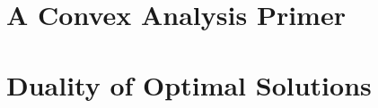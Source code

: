 \documentclass[11pt, a4paper, BCOR=7mm, DIV=11]{scrbook}
\theoremstyle{definition}
\theoremstyle{plain}
\begin{document}
\section{A Convex Analysis Primer}
  
\section{Duality of Optimal Solutions}
  

\renewcommand{\bibsection}
{
\chapter*{References}
\addcontentsline{toc}{chapter}{References}
}


\printindex
\end{document}
